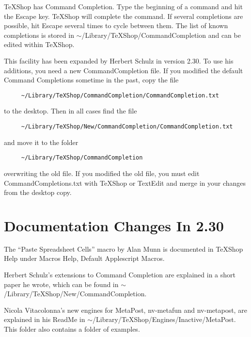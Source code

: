 \documentclass[11pt, oneside]{amsart}
\begin{document}
TeXShop has Command Completion. Type the beginning of a command and hit the Escape key. TeXShop will complete the command. If several completions are possible, hit Escape several times to cycle between them.
The list of known completions is stored in $\sim$/Library/TeXShop/CommandCompletion and  can be edited within TeXShop.

This facility has been expanded by Herbert Schulz in version 2.30. To use his additions, you need a new CommandCompletion file. 
If you modified the default Command Completions sometime in the past, copy the file 
\begin{verbatim}
     ~/Library/TeXShop/CommandCompletion/CommandCompletion.txt 
\end{verbatim}
 to  the desktop. Then in all cases find the file
 \begin{verbatim}
     ~/Library/TeXShop/New/CommandCompletion/CommandCompletion.txt 
\end{verbatim}
and move it to the folder  
\begin{verbatim}
     ~/Library/TeXShop/CommandCompletion 
\end{verbatim}
overwriting the old file.  If you modified the old file, you must edit CommandCompletions.txt with TeXShop or TextEdit and merge in your changes from the desktop copy.

\section{Documentation Changes In 2.30}

The ``Paste Spreadsheet Cells'' macro by Alan Munn is documented in TeXShop Help under Macros Help, Default Applescript Macros.

Herbert Schulz's extensions to Command Completion are explained in a short paper he wrote, which can be found in $\sim$/Library/TeXShop/New/CommandCompletion.

Nicola Vitacolonna's new engines for MetaPost, nv-metafun and nv-metapost, are explained in his ReadMe in
$\sim$/Library/TeXShop/Engines/Inactive/MetaPost. This folder also contains a folder of examples.



\end{document}
